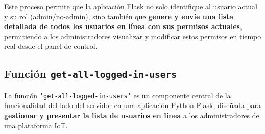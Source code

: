 \documentclass{report}
\begin{document}
Este proceso permite que la aplicación Flask no solo identifique al usuario actual y su rol (admin/no-admin), sino también que \textbf{genere y envíe una 
lista detallada de todos los usuarios en línea con sus permisos actuales}, permitiendo a los administradores visualizar y modificar estos permisos en tiempo 
real desde el panel de control.

\subsection{Función \texttt{get-all-logged-in-users}}
La función \texttt{'get-all-logged-in-users'} es un componente central de la funcionalidad del lado del servidor en una aplicación Python Flask, 
diseñada para \textbf{gestionar y presentar la lista de usuarios en línea} a los administradores de una plataforma IoT.
\end{document}
